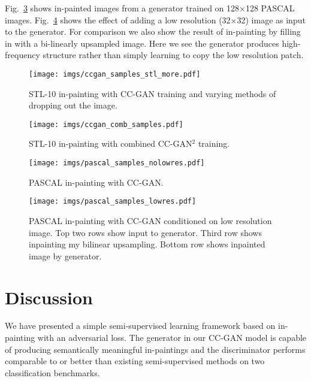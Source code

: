 \documentclass{article} \usepackage{iclr2017_conference,times}
\newcommand{\fig}[1]{Fig.~\ref{fig:#1}}
\begin{document}
\fig{pascal_samples_nolowres} shows in-painted images from a generator
trained on 128$\times$128 PASCAL images.  \fig{pascal_samples} shows
the effect of adding a low resolution (32$\times$32) image as input to
the generator.  For comparison we also show the result of in-painting
by filling in with a bi-linearly upsampled image.  Here we see the
generator produces high-frequency structure rather than simply learning to copy the low resolution patch.

\vspace{10mm}

\begin{figure}[t!]
\centering
  \texttt{[image: imgs/ccgan\_samples\_stl\_more.pdf]} 
\caption{STL-10 in-painting with CC-GAN training and varying methods of dropping out the image. }
\label{fig:ccgan_samples}
\vspace{2mm}
\end{figure}

\begin{figure}[t!]
\centering
  \texttt{[image: imgs/ccgan\_comb\_samples.pdf]} 
\caption{STL-10 in-painting with combined CC-GAN$^2$ training. }
\vspace{2mm}
\label{fig:ccgan_comb_samples}
\end{figure}

\begin{figure}[t!]
\centering
  \texttt{[image: imgs/pascal\_samples\_nolowres.pdf]} 
\caption{PASCAL in-painting with CC-GAN.}
\vspace{2mm}
\label{fig:pascal_samples_nolowres}
\end{figure}

\begin{figure}[t!]
\centering
  \texttt{[image: imgs/pascal\_samples\_lowres.pdf]} 
\caption{PASCAL in-painting with CC-GAN conditioned on low resolution image. Top two rows show input to generator. Third row shows inpainting my bilinear upsampling. Bottom row shows inpainted image by generator. }
\label{fig:pascal_samples}
\end{figure}



 
\section{Discussion}
We have presented a simple semi-supervised learning framework based on
in-painting with an adversarial loss.  The generator in our CC-GAN
model is capable of producing semantically meaningful in-paintings and
the discriminator performs comparable to or better than existing
semi-supervised methods on two classification benchmarks.
\end{document}
